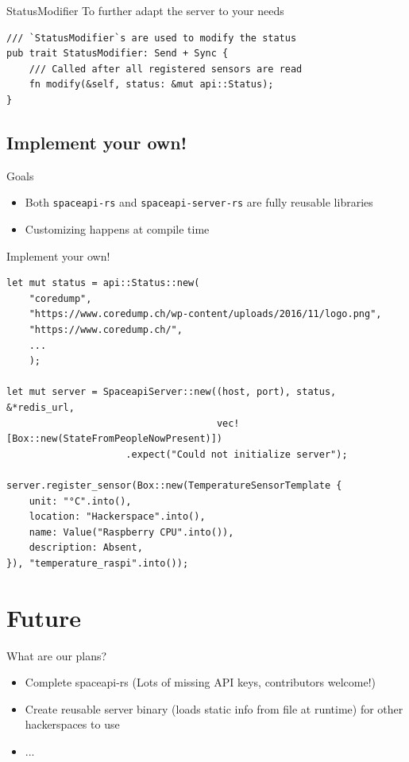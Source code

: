 \begin{frame}[fragile]{StatusModifier}
    To further adapt the server to your needs
    \begin{verbatim}
/// `StatusModifier`s are used to modify the status
pub trait StatusModifier: Send + Sync {
    /// Called after all registered sensors are read
    fn modify(&self, status: &mut api::Status);
}
    \end{verbatim}
\end{frame}


\subsection{Implement your own!}

\begin{frame}[c]{Goals}
    \begin{itemize}
        \item Both \texttt{spaceapi-rs} and \texttt{spaceapi-server-rs} are
            fully reusable libraries
        \item Customizing happens at compile time
    \end{itemize}
\end{frame}

\begin{frame}[fragile]{Implement your own!}
    \begin{verbatim}
let mut status = api::Status::new(
    "coredump",
    "https://www.coredump.ch/wp-content/uploads/2016/11/logo.png",
    "https://www.coredump.ch/",
    ...
    );

let mut server = SpaceapiServer::new((host, port), status, &*redis_url,
                                     vec![Box::new(StateFromPeopleNowPresent)])
                     .expect("Could not initialize server");

server.register_sensor(Box::new(TemperatureSensorTemplate {
    unit: "°C".into(),
    location: "Hackerspace".into(),
    name: Value("Raspberry CPU".into()),
    description: Absent,
}), "temperature_raspi".into());
    \end{verbatim}
\end{frame}


\section{Future}

\begin{frame}[c]{What are our plans?}
    \begin{itemize}
        \item Complete spaceapi-rs (Lots of missing API keys, contributors
            welcome!)
        \item Create reusable server binary (loads static info from file at
            runtime) for other hackerspaces to use
        \item ...
    \end{itemize}
\end{frame}

